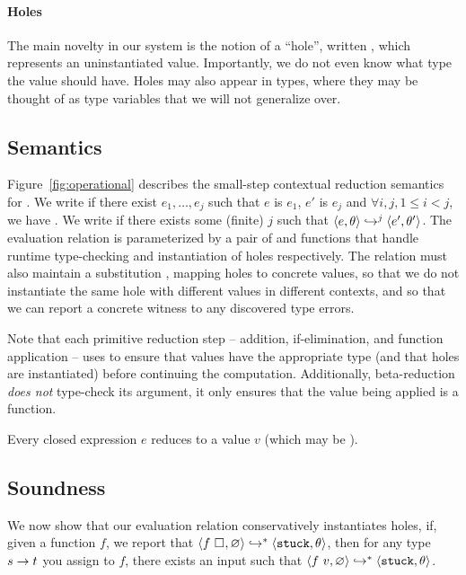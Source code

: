 \paragraph{Holes}
\label{sec:holes}
The main novelty in our system is the notion of a ``hole'', written
\ehole{}, which represents an uninstantiated value.
%
Importantly, we do not even know what type the value should have.
%
Holes may also appear in types, where they may be thought of as type
variables that we will not generalize over.
%
\subsection{Semantics}
\label{sec:semantics}

%
Figure~\ref{fig:operational} describes the small-step contextual
reduction semantics for \lang.
%
We write  if there exist $e_1,\ldots,e_j$ such that
$e$ is $e_1$, $e'$ is $e_j$ and $\forall i,j, 1 \leq i < j$, we have
.
%
We write  if there exists some (finite) $j$ such that
$\stepi{j}{e}{\su}{e'}{\su'}$.
%
The evaluation relation is parameterized by a pair of \forcesym and
\gensym functions that handle runtime type-checking and instantiation of
holes respectively.
%
The relation must also maintain a substitution \su, mapping holes to
concrete values, so that we do not instantiate the same hole with
different values in different contexts, and so that we can report a
concrete witness to any discovered type errors.

Note that each primitive reduction step -- addition, if-elimination, and
function application -- uses \forcesym to ensure that values have the
appropriate type (and that holes are instantiated) before continuing the
computation.
%
Additionally, beta-reduction \emph{does not} type-check its argument, it
only ensures that the value being applied is a function.
%
\begin{thm}
\label{thm:all-reduce}
  Every closed expression $e$ reduces to a value $v$ (which may be \stuck).
\end{thm}
%
\subsection{Soundness}
\label{sec:soundness}
We now show that our evaluation relation conservatively instantiates
holes, \ie if, given a function $f$, we report that 
$\steps{\eapp{f}{\ehole{}}}{\emptysu}{\stuck}{\su}$,
then for any type $\tfun{s}{t}$ you assign to $f$, there exists an input  such that
$\steps{\eapp{f}{v}}{\emptysu}{\stuck}{\su}$.

